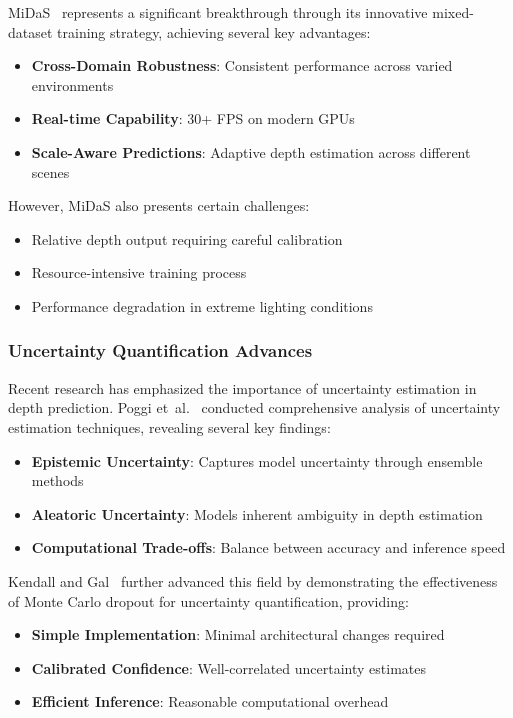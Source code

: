 \documentclass[12pt,oneside]{book}
\begin{document}
MiDaS~\cite{ranftl2020towards} represents a significant breakthrough through its innovative mixed-dataset training strategy, achieving several key advantages:

\begin{itemize}
    \item \textbf{Cross-Domain Robustness}: Consistent performance across varied environments
    \item \textbf{Real-time Capability}: 30+ FPS on modern GPUs
    \item \textbf{Scale-Aware Predictions}: Adaptive depth estimation across different scenes
\end{itemize}

However, MiDaS also presents certain challenges:
\begin{itemize}
    \item Relative depth output requiring careful calibration
    \item Resource-intensive training process
    \item Performance degradation in extreme lighting conditions
\end{itemize}

\subsubsection{Uncertainty Quantification Advances}
Recent research has emphasized the importance of uncertainty estimation in depth prediction. Poggi et~al.~\cite{poggi2020uncertainty} conducted comprehensive analysis of uncertainty estimation techniques, revealing several key findings:

\begin{itemize}
    \item \textbf{Epistemic Uncertainty}: Captures model uncertainty through ensemble methods
    \item \textbf{Aleatoric Uncertainty}: Models inherent ambiguity in depth estimation
    \item \textbf{Computational Trade-offs}: Balance between accuracy and inference speed
\end{itemize}

Kendall and Gal~\cite{kendall2017uncertainties} further advanced this field by demonstrating the effectiveness of Monte Carlo dropout for uncertainty quantification, providing:

\begin{itemize}
    \item \textbf{Simple Implementation}: Minimal architectural changes required
    \item \textbf{Calibrated Confidence}: Well-correlated uncertainty estimates
    \item \textbf{Efficient Inference}: Reasonable computational overhead
\end{itemize}
\end{document}
